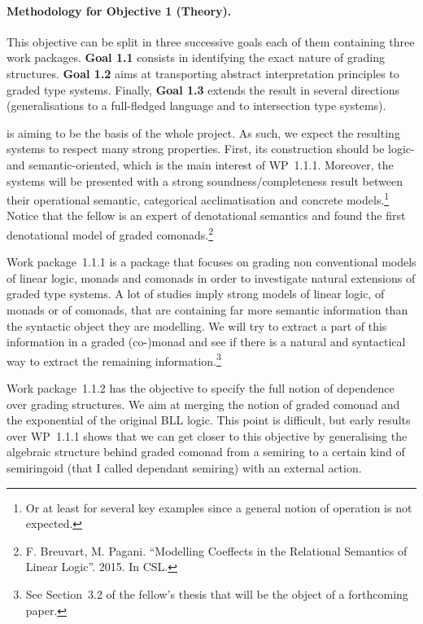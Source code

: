 \documentclass{article}[11pt]
\begin{document}
\paragraph{Methodology for Objective 1 (Theory).}

This objective can be split in three successive goals each of them containing three work packages. {\bf Goal 1.1} consists in identifying the exact nature of grading structures. {\bf Goal 1.2} aims at transporting abstract interpretation principles to graded type systems. Finally, {\bf Goal 1.3} extends the result in several directions (generalisations to a full-fledged language and to intersection type systems).

 is aiming to be the basis of the whole project. As such, we expect the resulting systems to respect many strong properties. First, its construction should be logic- and semantic-oriented, which is the main interest of WP~1.1.1. Moreover, the systems will be presented with a strong soundness/completeness result between their operational semantic, categorical acclimatisation and concrete models.\footnote{Or at least for several key examples since a general notion of operation is not expected.} Notice that the fellow is an expert of denotational semantics and found the first denotational model of graded comonads.\footnote{F. Breuvart, M. Pagani. ``Modelling Coeffects in the Relational Semantics of Linear Logic''. 2015. In CSL.}

 Work package~1.1.1 is a package that focuses on grading non conventional models of linear logic, monads and comonads in order to investigate natural extensions of graded type systems. A lot of studies imply strong models of linear logic, of monads or of comonads, that are containing far more semantic information than the syntactic object they are modelling. We will try to extract a part of this information in a graded (co-)monad and see if there is a natural and syntactical way to extract the remaining information.\footnote{See Section~3.2 of the fellow's thesis that will be the object of a forthcoming paper.}

Work package~1.1.2 has the objective to specify the full notion of dependence over grading structures. We aim at merging the notion of graded comonad and the exponential of the original BLL logic. This point is difficult, but early results over WP~1.1.1 shows that we can get closer to this objective by generalising the algebraic structure behind graded comonad from a semiring to a certain kind of semiringoid (that I called dependant semiring) with an external action.
\end{document}
